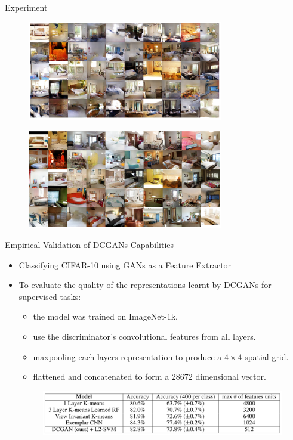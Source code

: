 \documentclass[10pt]{beamer}
\begin{document}
	\begin{frame}{Experiment}
		\begin{figure}
			\includegraphics[width=23em]{figures/DCGAN-generated-image-epoch-1.png}
		\end{figure}
		\vspace{-1.5em}
		\begin{figure}
			\includegraphics[width=23em]{figures/DCGAN-generated-image-epoch-5.png}
		\end{figure}
	\end{frame}

	\begin{frame}{Empirical Validation of DCGANs Capabilities}
		\begin{itemize}
			\item Classifying CIFAR-10 using GANs as a Feature Extractor
			\item To evaluate the quality of the representations learnt by DCGANs for supervised tasks:
			\begin{itemize}
				\item the model was trained on ImageNet-1k.
				\item use the discriminator's convolutional features from all layers.
				\item maxpooling each layers representation to produce a $4\times 4$ spatial grid.
				\item flattened and concatenated to form a 28672 dimensional vector.
			\end{itemize}
			\begin{figure}
				\includegraphics[width=30em]{figures/DCGAN-discriminator-feature-extractor-cifar-10.png}
			\end{figure}
		\end{itemize}
	\end{frame}
\end{document}
